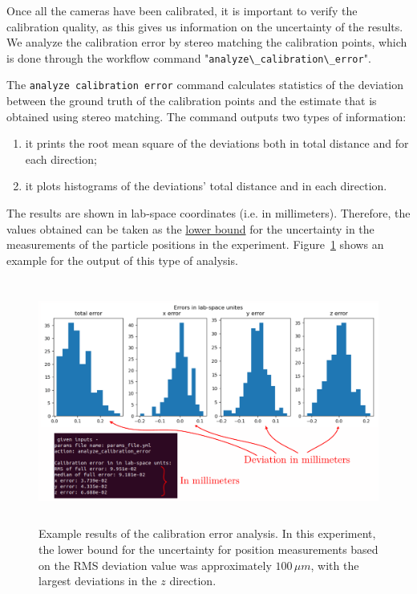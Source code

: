 \documentclass[10pt,a4paper]{article}
\begin{document}
	
Once all the cameras have been calibrated, it is important to verify the calibration quality, as this gives us information on the uncertainty of the results. We analyze the calibration error by stereo matching the calibration points, which is done through the workflow command "\verb!analyze\_calibration\_error!". 

The \texttt{analyze calibration error} command calculates statistics of the deviation between the ground truth of the calibration points and the estimate that is obtained using stereo matching. The command outputs two types of information: 
\begin{enumerate}
	\item it prints the root mean square of the deviations both in total distance and for each direction;
	
	\item it plots histograms of the deviations' total distance and in each direction.
\end{enumerate}
%
The results are shown in lab-space coordinates (i.e. in millimeters). Therefore, the values obtained can be taken as the \underline{lower bound} for the uncertainty in the measurements of the particle positions in the experiment. Figure~\ref{fig:cal_error} shows an example for the output of this type of analysis. 




\begin{figure}[h!]
	\centering
	\includegraphics[height=8cm]{Cal_error_analysis.pdf}
	\caption{Example results of the calibration error analysis. In this experiment, the lower bound for the uncertainty for position measurements based on the RMS deviation value was approximately $100 \, \mu m$, with the largest deviations in the $z$ direction.}
	\label{fig:cal_error}
\end{figure}
\end{document}
